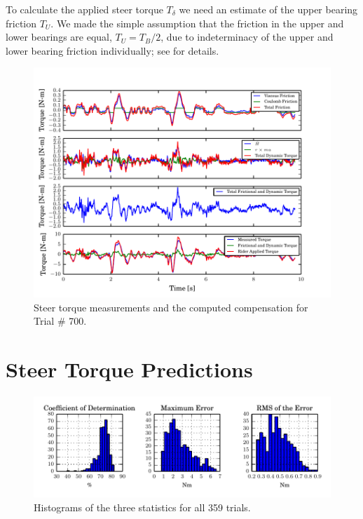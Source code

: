 \documentclass[a4paper]{article}
\begin{document}
To calculate the applied steer torque $T_\delta$ we need an estimate of the
upper bearing friction $T_U$. We made the simple assumption that the friction
in the upper and lower bearings are equal, $T_U = T_B / 2$, due to
indeterminacy of the upper and lower bearing friction individually; see
\cite{Moore2012} for details.

\begin{figure}
  \centering
  \includegraphics{figures/steer-torque-components.pdf}
  \caption{Steer torque measurements and the computed compensation for Trial \#
    700.}
  \label{fig:steer-torque-components}
\end{figure}

\section*{Steer Torque Predictions}

\begin{figure}
  \centering
  \includegraphics{figures/error-stats.pdf}
  \caption{Histograms of the three statistics for all 359 trials.}
  \label{fig:error-stats}
\end{figure}
\end{document}
